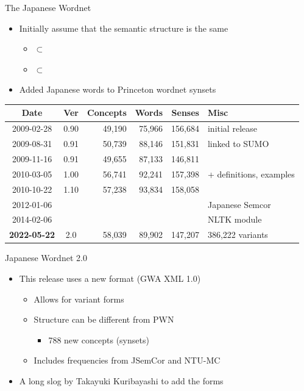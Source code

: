 \documentclass{beamer}
\begin{document}
\begin{frame}{The Japanese Wordnet}
\begin{itemize}
\item Initially assume that the semantic structure is the same
  \begin{itemize}
  \item {} $\subset$ 
  \item[$\Rightarrow$]  $\subset$ 
  \end{itemize}
\item Added Japanese words to Princeton wordnet synsets
\end{itemize}
\begin{tabular}{ccrrrl}
  Date       & Ver & Concepts & Words & Senses  & Misc \\ \hline
  2009-02-28 & 0.90 &  49,190 & 75,966 & 156,684 & initial release \\
  2009-08-31 & 0.91 &  50,739 & 88,146 & 151,831 & linked to SUMO \\
  2009-11-16 & 0.91 &  49,655 & 87,133 & 146,811  & \\
  2010-03-05 & 1.00 &  56,741 & 92,241 & 157,398 & + definitions, examples \\
  2010-10-22 & 1.10 &  57,238 & 93,834 & 158,058 & \\
  2012-01-06 &      &         &        &          & Japanese Semcor \\
  2014-02-06 &      &         &        &          & NLTK module \\
  \textbf{2022-05-22} & 2.0  &  58,039 & 89,902 & 147,207 & 386,222  variants \\
\end{tabular}
\end{frame}

\begin{frame}{Japanese Wordnet 2.0}
  \begin{itemize}
  \item This release uses a new format (GWA XML 1.0)
    \begin{itemize}
    \item Allows for variant forms
    \item Structure can be different from PWN
      \begin{itemize}
      \item 788 new concepts (synsets)
      \end{itemize}
    \item Includes frequencies from JSemCor and NTU-MC
    \end{itemize}
  \item A long slog by Takayuki Kuribayashi to add the forms
    
  \end{itemize}
\end{frame}
\end{document}
